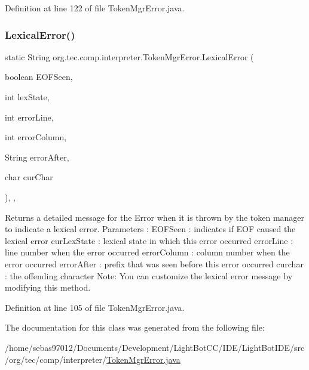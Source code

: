 Definition at line 122 of file Token\+Mgr\+Error.\+java.

\mbox{\label{classorg_1_1tec_1_1comp_1_1interpreter_1_1_token_mgr_error_a37270639947dc5a998abcf8031b121f2}} 
\subsubsection{\texorpdfstring{Lexical\+Error()}{LexicalError()}}
{\footnotesize\ttfamily static String org.\+tec.\+comp.\+interpreter.\+Token\+Mgr\+Error.\+Lexical\+Error (\begin{DoxyParamCaption}\item[{boolean}]{E\+O\+F\+Seen,  }\item[{int}]{lex\+State,  }\item[{int}]{error\+Line,  }\item[{int}]{error\+Column,  }\item[{String}]{error\+After,  }\item[{char}]{cur\+Char }\end{DoxyParamCaption})\hspace{0.3cm}{\ttfamily [inline]}, {\ttfamily [static]}, {\ttfamily [protected]}}

Returns a detailed message for the Error when it is thrown by the token manager to indicate a lexical error. Parameters \+: E\+O\+F\+Seen \+: indicates if E\+OF caused the lexical error cur\+Lex\+State \+: lexical state in which this error occurred error\+Line \+: line number when the error occurred error\+Column \+: column number when the error occurred error\+After \+: prefix that was seen before this error occurred curchar \+: the offending character Note\+: You can customize the lexical error message by modifying this method. 

Definition at line 105 of file Token\+Mgr\+Error.\+java.



The documentation for this class was generated from the following file\+:\begin{DoxyCompactItemize}
\item 
/home/sebas97012/\+Documents/\+Development/\+Light\+Bot\+C\+C/\+I\+D\+E/\+Light\+Bot\+I\+D\+E/src/org/tec/comp/interpreter/\mbox{\hyperlink{_token_mgr_error_8java}{Token\+Mgr\+Error.\+java}}\end{DoxyCompactItemize}
